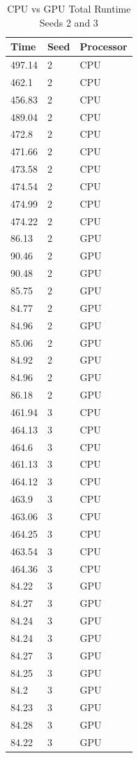 \begin{table}
\caption{CPU vs GPU Total Runtime Seeds 2 and 3}
\centering
 \begin{tabular}{ | l | l | l |}
    \hline
    Time & Seed & Processor \\ \hline
    497.14 & 2 & CPU \\ \hline
    462.1 & 2 & CPU \\ \hline
    456.83 & 2 & CPU \\ \hline
    489.04 & 2 & CPU \\ \hline
    472.8 & 2 & CPU \\ \hline
    471.66 & 2 & CPU \\ \hline
    473.58 & 2 & CPU \\ \hline
    474.54 & 2 & CPU \\ \hline
    474.99 & 2 & CPU \\ \hline
    474.22 & 2 & CPU \\ \hline
    86.13 & 2 & GPU \\ \hline
    90.46 & 2 & GPU \\ \hline
    90.48 & 2 & GPU \\ \hline
    85.75 & 2 & GPU \\ \hline
    84.77 & 2 & GPU \\ \hline
    84.96 & 2 & GPU \\ \hline
    85.06 & 2 & GPU \\ \hline
    84.92 & 2 & GPU \\ \hline
    84.96 & 2 & GPU \\ \hline
    86.18 & 2 & GPU \\ \hline
    461.94 & 3 & CPU \\ \hline
    464.13 & 3 & CPU \\ \hline
    464.6 & 3 & CPU \\ \hline
    461.13 & 3 & CPU \\ \hline
    464.12 & 3 & CPU \\ \hline
    463.9 & 3 & CPU \\ \hline
    463.06 & 3 & CPU \\ \hline
    464.25 & 3 & CPU \\ \hline
    463.54 & 3 & CPU \\ \hline
    464.36 & 3 & CPU \\ \hline
    84.22 & 3 & GPU \\ \hline
    84.27 & 3 & GPU \\ \hline
    84.24 & 3 & GPU \\ \hline
    84.24 & 3 & GPU \\ \hline
    84.27 & 3 & GPU \\ \hline
    84.25 & 3 & GPU \\ \hline
    84.2 & 3 & GPU \\ \hline
    84.23 & 3 & GPU \\ \hline
    84.28 & 3 & GPU \\ \hline
    84.22 & 3 & GPU \\ \hline
    \end{tabular}
\label{table:CPU vs GPU total runtime part 2}
\end{table}


